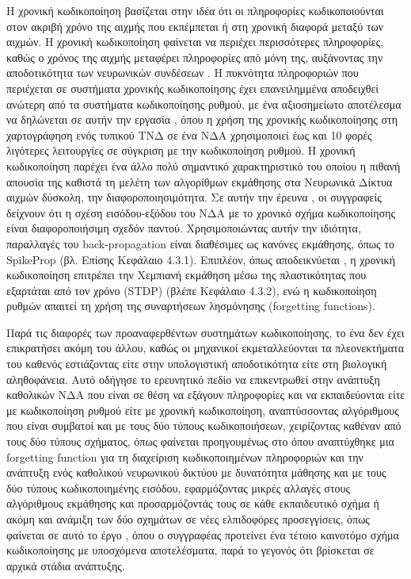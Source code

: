 \documentclass[12pt]{report}
\begin{document}
Η χρονική κωδικοποίηση βασίζεται στην ιδέα ότι οι πληροφορίες κωδικοποιούνται στον ακριβή χρόνο της αιχμής που εκπέμπεται ή στη χρονική διαφορά μεταξύ των αιχμών. Η χρονική κωδικοποίηση φαίνεται να περιέχει περισσότερες πληροφορίες, καθώς ο χρόνος της αιχμής μεταφέρει πληροφορίες από μόνη της, αυξάνοντας την αποδοτικότητα των νευρωνικών συνδέσεων \cite{Mainen2009}. Η πυκνότητα πληροφοριών που περιέχεται σε συστήματα χρονικής κωδικοποίησης έχει επανειλημμένα αποδειχθεί ανώτερη από τα συστήματα κωδικοποίησης ρυθμού, με ένα αξιοσημείωτο αποτέλεσμα να δηλώνεται σε αυτήν την εργασία \cite{IEEE2018}, όπου η χρήση της χρονικής κωδικοποίησης στη χαρτογράφηση ενός τυπικού ΤΝΔ σε ένα ΝΔΑ χρησιμοποιεί έως και 10 φορές λιγότερες λειτουργίες σε σύγκριση με την κωδικοποίηση ρυθμού. Η χρονική κωδικοποίηση παρέχει ένα άλλο πολύ σημαντικό χαρακτηριστικό του οποίου η πιθανή απουσία της καθιστά τη μελέτη των αλγορίθμων εκμάθησης στα Νευρωνικά Δίκτυα αιχμών δύσκολη, την  διαφοροποιησιμότητα. Σε αυτήν την έρευνα \cite{Mostafa2018}, οι συγγραφείς δείχνουν ότι η σχέση εισόδου-εξόδου του ΝΔΑ με το χρονικό σχήμα κωδικοποίησης είναι διαφοροποιήσιμη σχεδόν παντού. Χρησιμοποιώντας αυτήν την ιδιότητα, παραλλαγές του \textlatin{back-propagation} είναι διαθέσιμες ως κανόνες εκμάθησης, όπως το \textlatin{SpikeProp} \cite{Bohte2002} (βλ. Επίσης Κεφάλαιο 4.3.1). Επιπλέον, όπως αποδεικνύεται , η χρονική κωδικοποίηση επιτρέπει την Χεμπιανή εκμάθηση μέσω της πλαστικότητας που εξαρτάται από τον χρόνο (\textlatin{STDP}) (βλέπε Κεφάλαιο 4.3.2), ενώ η κωδικοποίηση ρυθμών απαιτεί τη χρήση της συναρτήσεων λησμόνησης (\textlatin{forgetting functions}).

\medskip
Παρά τις διαφορές των προαναφερθέντων συστημάτων κωδικοποίησης, το ένα δεν έχει επικρατήσει ακόμη του άλλου, καθώς οι μηχανικοί εκμεταλλεύονται τα πλεονεκτήματα του καθενός εστιάζοντας είτε στην υπολογιστική αποδοτικότητα είτε στη βιολογική αληθοφάνεια. Αυτό οδήγησε το ερευνητικό πεδίο να επικεντρωθεί στην ανάπτυξη καθολικών ΝΔΑ που είναι σε θέση να εξάγουν πληροφορίες και να εκπαιδεύονται είτε με κωδικοποίηση ρυθμού είτε με χρονική κωδικοποίηση, αναπτύσσοντας αλγόριθμους που είναι συμβατοί και με τους δύο τύπους κωδικοποιήσεων, χειρίζοντας καθέναν από τους δύο τύπους σχήματος, όπως φαίνεται προηγουμένως στο \cite{Lobov2020} όπου αναπτύχθηκε μια \textlatin{forgetting function} για τη διαχείριση κωδικοποιημένων πληροφοριών και την ανάπτυξη ενός καθολικού νευρωνικού δικτύου με δυνατότητα μάθησης και με τους δύο τύπους κωδικοποιημένης εισόδου, εφαρμόζοντας μικρές αλλαγές στους αλγόριθμους εκμάθησης και προσαρμόζοντάς τους σε κάθε εκπαιδευτικό σχήμα \cite{Yin201} ή ακόμη και ανάμιξη των δύο σχημάτων σε νέες ελπιδοφόρες προσεγγίσεις, όπως φαίνεται σε αυτό το έργο \cite{Kiselev2016}, όπου ο συγγραφέας προτείνει ένα τέτοιο καινοτόμο σχήμα κωδικοποίησης με υποσχόμενα αποτελέσματα, παρά το γεγονός ότι βρίσκεται σε αρχικά στάδια ανάπτυξης.
\end{document}
